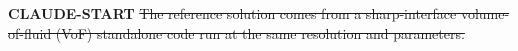 %
\textbf{CLAUDE-START}
{\color{red}\sout{The reference solution comes from a sharp-interface volume-of-fluid (VoF) standalone code run at the same resolution and parameters.}}

